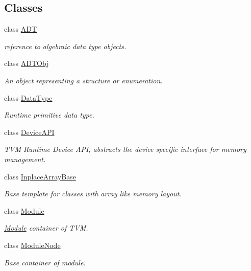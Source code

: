 \subsection*{Classes}
\begin{DoxyCompactItemize}
\item 
class \hyperlink{classtvm_1_1runtime_1_1ADT}{A\+DT}
\begin{DoxyCompactList}\small\item\em reference to algebraic data type objects. \end{DoxyCompactList}\item 
class \hyperlink{classtvm_1_1runtime_1_1ADTObj}{A\+D\+T\+Obj}
\begin{DoxyCompactList}\small\item\em An object representing a structure or enumeration. \end{DoxyCompactList}\item 
class \hyperlink{classtvm_1_1runtime_1_1DataType}{Data\+Type}
\begin{DoxyCompactList}\small\item\em Runtime primitive data type. \end{DoxyCompactList}\item 
class \hyperlink{classtvm_1_1runtime_1_1DeviceAPI}{Device\+A\+PI}
\begin{DoxyCompactList}\small\item\em T\+VM Runtime Device A\+PI, abstracts the device specific interface for memory management. \end{DoxyCompactList}\item 
class \hyperlink{classtvm_1_1runtime_1_1InplaceArrayBase}{Inplace\+Array\+Base}
\begin{DoxyCompactList}\small\item\em Base template for classes with array like memory layout. \end{DoxyCompactList}\item 
class \hyperlink{classtvm_1_1runtime_1_1Module}{Module}
\begin{DoxyCompactList}\small\item\em \hyperlink{classtvm_1_1runtime_1_1Module}{Module} container of T\+VM. \end{DoxyCompactList}\item 
class \hyperlink{classtvm_1_1runtime_1_1ModuleNode}{Module\+Node}
\begin{DoxyCompactList}\small\item\em Base container of module. \end{DoxyCompactList}\item 

\end{DoxyCompactItemize}

